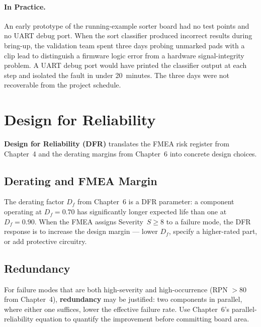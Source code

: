 \paragraph{In Practice.}
An early prototype of the running-example sorter board had no test points and no
UART debug port.
When the sort classifier produced incorrect results during bring-up, the
validation team spent three days probing unmarked pads with a clip lead to
distinguish a firmware logic error from a hardware signal-integrity problem.
A UART debug port would have printed the classifier output at each step and
isolated the fault in under 20~minutes.
The three days were not recoverable from the project schedule.

\section{Design for Reliability}
\label{sec:ch7-dfr}

\textbf{Design for Reliability (DFR)} translates
the FMEA risk register from Chapter~4 and the derating margins from Chapter~6
into concrete design choices.

\subsection{Derating and FMEA Margin}
\label{sec:ch7-dfr-margin}

The derating factor $D_f$ from Chapter~6 is a DFR parameter: a component
operating at $D_f = 0.70$ has significantly longer expected life than one at
$D_f = 0.90$.
When the FMEA assigns Severity~$S \geq 8$ to a failure mode, the DFR response
is to increase the design margin --- lower $D_f$, specify a higher-rated part,
or add protective circuitry.

\subsection{Redundancy}
\label{sec:ch7-dfr-redundancy}

For failure modes that are both high-severity and high-occurrence (RPN $> 80$
from Chapter~4), \textbf{redundancy} may be justified:
two components in parallel, where either one suffices, lower the effective
failure rate.
Use Chapter~6's parallel-reliability equation to quantify the improvement before
committing board area.

